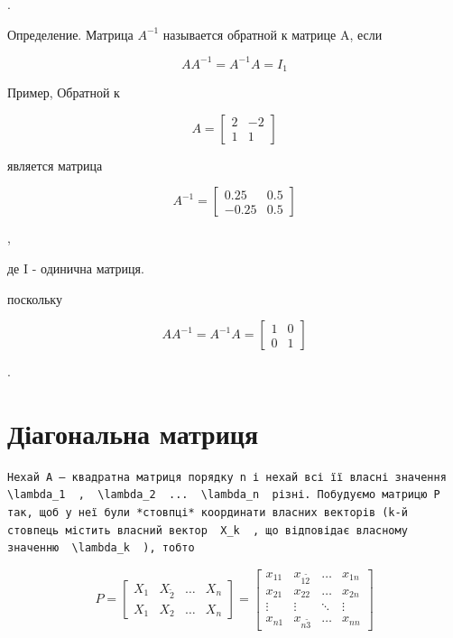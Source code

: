 \documentclass[
  ukrainian,
]{article}
\begin{document}
.

Определение. Матрица \(A^{-1}\) называется обратной к матрице A, если

\[
AA^{-1} = A^{-1}A = I_1
\]

Пример, Обратной к

\[
A =
\begin{bmatrix} 2 & -2 \\ 1 & 1 \end{bmatrix}
\]

является матрица

\[
A^{-1} =
\begin{bmatrix} 0.25 & 0.5 \\ -0.25 & 0.5 \end{bmatrix}
\]

,

де I - одинична матриця.

поскольку

\[
AA^{-1} = A^{-1}A =
\begin{bmatrix} 1 & 0 \\ 0 & 1 \end{bmatrix}
\]

.

\section{Діагональна
матриця}\label{ux434ux456ux430ux433ux43eux43dux430ux43bux44cux43dux430-ux43cux430ux442ux440ux438ux446ux44f}

\begin{verbatim}
Нехай A — квадратна матриця порядку n і нехай всі її власні значення  \lambda_1  ,  \lambda_2  ...  \lambda_n  різні. Побудуємо матрицю P так, щоб у неї були *стовпці* координати власних векторів (k-й стовпець містить власний вектор  X_k  , що відповідає власному значенню  \lambda_k  ), тобто
\end{verbatim}

\[
P =
\begin{bmatrix} X_1 & X_{\tilde{2}} & \dots & X_n \\ X_{1} & X_{2} & \dots & X_n \end{bmatrix}
=
\begin{bmatrix} x_{11} & x_{1\tilde{2}} & \dots & x_{1n} \\ x_{21} & x_{22} & \dots & x_{2n} \\ \vdots & \vdots & \ddots & \vdots \\ x_{n1} & x_{n\tilde{3}} & \dots & x_{nn} \end{bmatrix}
\]
\end{document}
